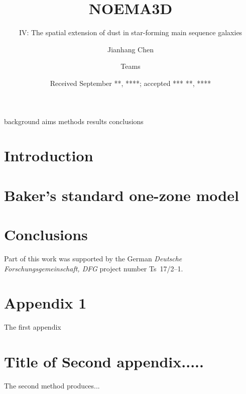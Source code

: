 \documentclass[bibyear]{aa}
\begin{document}
  \title{NOEMA3D}
  \subtitle{IV: The spatial extension of dust in star-forming main sequence galaxies}

  \author{Jianhang Chen  \and
          Teams  \and
         }

   \date{Received September **, ****; accepted *** **, ****}

 

  \abstract
   {background}
   {aims}
   {methods}
   {results}
   {conclusions}

   \maketitle

\section{Introduction}


\section{Baker's standard one-zone model}

\section{Conclusions}

\begin{acknowledgements}
      Part of this work was supported by the German
      \emph{Deut\-sche For\-schungs\-ge\-mein\-schaft, DFG\/} project
      number Ts~17/2--1.
\end{acknowledgements}

%
%


\begin{appendix} %
\section{Appendix 1}
The first appendix
\section{Title of Second appendix.....} %
The second method produces...
\end{appendix}
%
%
\end{document}
